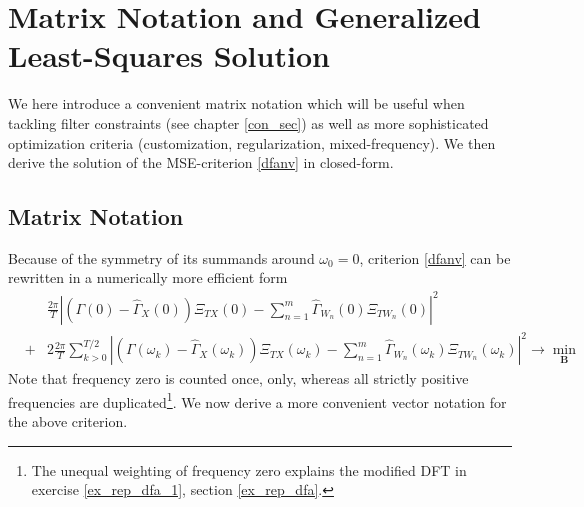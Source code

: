 \documentclass[a4paper]{book}
\begin{document}
\section{Matrix Notation and Generalized Least-Squares Solution}\label{matrix_not}

We here introduce a convenient matrix notation which will be useful when tackling filter constraints (see chapter \ref{con_sec}) as well as more sophisticated optimization criteria (customization, regularization, mixed-frequency). We then derive the solution of the MSE-criterion \ref{dfanv} in closed-form.

\subsection{Matrix Notation}\label{matrix_notation}

Because of the symmetry of its summands around $\omega_0=0$, criterion \ref{dfanv} can be rewritten in a numerically more efficient form
\begin{eqnarray}\label{dfanv_s}
&&\frac{2\pi}{T}\left|\left(\Gamma(0)-\hat{\Gamma}_X(0)\right)\Xi_{TX}(0)-\sum_{n=1}^m\hat{\Gamma}_{W_n}(0)\Xi_{TW_n}(0)\right|^2\nonumber\\
&+&2\frac{2\pi}{T} \sum_{k>0}^{T/2}\left|\left(\Gamma(\omega_k)-\hat{\Gamma}_X(\omega_k)\right)\Xi_{TX}(\omega_k)-\sum_{n=1}^m\hat{\Gamma}_{W_n}(\omega_k)\Xi_{TW_n}(\omega_k)\right|^2 \to \min_{\mathbf{B}}
\end{eqnarray}
Note that frequency zero is counted once, only,  whereas all strictly positive frequencies are duplicated\footnote{The unequal weighting of frequency zero explains the modified DFT in exercise \ref{ex_rep_dfa_1}, section \ref{ex_rep_dfa}.}. We now derive a more convenient vector notation for the above criterion.\\
\end{document}
